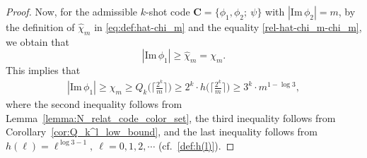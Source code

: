 \documentclass[11pt,draftclsnofoot,onecolumn]{IEEEtran}
\newcommand{\mbC}{\mathbf{C}}
\def\Im{\mathrm{Im}}
\begin{document}
{\begin{proof}
Now, for the admissible $k$-shot code $\mbC=\big\{\phi_{1}, \phi_2;~\psi\big\}$ with $|\Im\,\phi_2|=m$, by the definition of $\widehat{\chi}_m$ in \eqref{eq:def:hat-chi_m} and the equality \eqref{rel-hat-chi_m-chi_m}, we obtain that
\begin{equation*}
|\Im\,\phi_1|\geq \widehat{\chi}_m=\chi_m.
\end{equation*}
 This implies that
 \begin{align}
		|\Im\,\phi_1|\geq\chi_m\geq Q_
		{k}\Big(\Big\lceil\frac{2^{k}}{m}\Big\rceil\Big)\geq 2^{k}\cdot h\Big( \Big\lceil\frac{2^{k}}{m}\Big\rceil\Big)\geq3^k\cdot m^{1-\log3},\label{eq:gener-dis-fun-pf_upp_bound-1}
	\end{align}
where the second inequality follows from  Lemma~\ref{lemma:N_relat_code_color_set}, the third inequality follows from Corollary~\ref{cor:Q_k^l_low_bound}, and the last inequality follows from
$h(\ell)=\ell^{\log3-1},~\ell=0,1,2,\cdots$  (cf.~\eqref{def:h(l)}).


\end{proof}}
\end{document}
